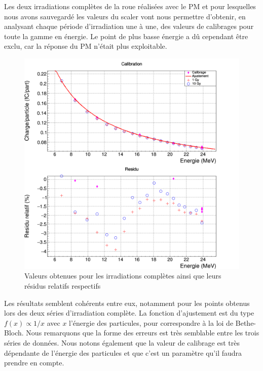 \documentclass[a4paper,11pt]{article}
\begin{document}
Les deux irradiations complètes de la roue réalisées avec le PM et pour lesquelles nous avons sauvegardé les valeurs du scaler vont nous permettre d'obtenir, en analysant chaque période d'irradiation une à une, des valeurs de calibrages pour toute la gamme en énergie. 
Le point de plus basse énergie a dû cependant être exclu, car la réponse du PM n'était plus exploitable.
\begin{figure}[h]
\begin{center}
\includegraphics[scale=0.4]{Calibration.png} 
\caption{\label{fig:calib}\footnotesize{Valeurs obtenues pour les irradiations complètes ainsi que leurs résidus relatifs respectifs}}
\end{center}
\end{figure}

Les résultats semblent cohérents entre eux, notamment pour les points obtenus lors des deux séries d'irradiation complète. 
La fonction d'ajustement est du type $f(x)\propto 1/x$ avec $x$ l'énergie des particules, pour correspondre à la loi de Bethe-Bloch.
Nous remarquons que la forme des erreurs est très semblable entre les trois séries de données.
Nous notons également que la valeur de calibrage est très dépendante de l'énergie des particules et que c'est un paramètre qu'il faudra prendre en compte.
\end{document}
